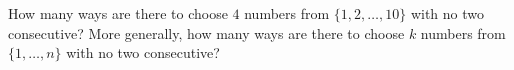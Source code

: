 How many ways are there to choose $4$ numbers from $\{1,2,\dots,10\}$ with no two consecutive? More generally, how many ways are there to choose $k$ numbers from $\{1,\dots,n\}$ with no two consecutive?

